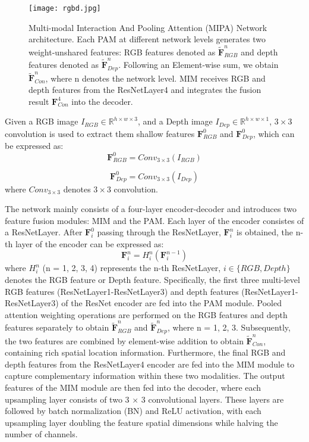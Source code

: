 \documentclass{aims}
\numberwithin{equation}{section}
\begin{document}
\begin{figure}[t]
\centering
\texttt{[image: rgbd.jpg]}
\caption{Multi-modal Interaction And Pooling Attention (MIPA) Network architecture. Each PAM at different network levels generates two weight-unshared features: RGB features denoted as $ \tilde{\bm F}_{RGB}^{n}$ and depth features denoted as $\tilde{\bm F}_{Dep}^{n}$. Following an Element-wise sum, we obtain $\tilde{\bm F}_{Con}^{n}$, where n denotes the network level. MIM receives RGB and depth features from the ResNetLayer4 and integrates the fusion result ${\bm F}_{Con}^{4}$ into the decoder.\label{fig:net}}
\end{figure}  

Given a RGB image $ {I}_{RGB} \in {\mathbb{R}}^{h\times w \times 3}$, and a Depth image $ {I}_{Dep} \in {\mathbb{R}}^{h\times w \times 1}$, $3 \times 3$ convolution is used to extract them shallow features ${\bm F}_{RGB}^{0}$ and ${\bm F}_{Dep}^{0}$, which can be expressed as:
\begin{equation}
    \label{eq1}
    {\bm F}_{RGB}^{0} = {Conv}_{3\times3}({I}_{RGB})
\end{equation}

\begin{equation}
    \label{eq2}
    {\bm F}_{Dep}^{0} = {Conv}_{3\times3}({I}_{Dep})
\end{equation}
where ${Conv}_{3\times3}$ denotes $3 \times 3$ convolution.

The network mainly consists of a four-layer encoder-decoder and introduces two feature fusion modules: MIM and the PAM. Each layer of the encoder consistes of a ResNetLayer. After ${\bm F}_{i}^{0}$ passing through the ResNetLayer, ${\bm F}_{i}^{n}$ is obtained, the n-th layer of the encoder can be expressed as:
\begin{equation}
    \label{eq3}
    {\bm F}_{i}^{n} = H_{i}^{n}({\bm F}_{i}^{n-1})
\end{equation}
where ${H}_{i}^{n}$ (n = 1, 2, 3, 4) represents the n-th ResNetLayer, $ i\in \{RGB,Depth\}$ denotes the RGB feature or Depth feature. Specifically, the first three multi-level RGB features (ResNetLayer1-ResNetLayer3) and depth features (ResNetLayer1-ResNetLayer3) of the ResNet encoder are fed into the PAM module. Pooled attention weighting operations are performed on the RGB features and depth features separately to obtain $\tilde{\bm F}_{RGB}^{n}$ and $\tilde{\bm F}_{Dep}^{n}$, where n = 1, 2, 3. Subsequently, the two features are combined by element-wise addition to obtain $\tilde{\bm F}_{Con}^{n}$, containing rich spatial location information. Furthermore, the final RGB and depth features from the ResNetLayer4 encoder are fed into the MIM module to capture complementary information within these two modalities. The output features of the MIM module are then fed into the decoder, where each upsampling layer consists of two 3 $\times$ 3 convolutional layers. These layers are followed by batch normalization (BN) and ReLU activation, with each upsampling layer doubling the feature spatial dimensions while halving the number of channels.
\end{document}
